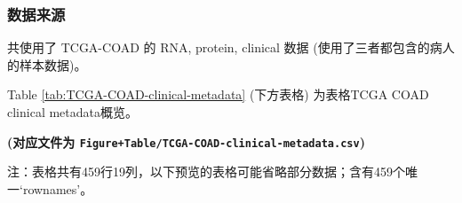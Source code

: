 \documentclass[
]{article}
\begin{document}
\hypertarget{ux6570ux636eux6765ux6e90-1}{%
\subsubsection{数据来源}\label{ux6570ux636eux6765ux6e90-1}}

共使用了 TCGA-COAD 的 RNA, protein, clinical 数据 (使用了三者都包含的病人的样本数据)。

Table \ref{tab:TCGA-COAD-clinical-metadata} (下方表格) 为表格TCGA COAD clinical metadata概览。

\textbf{(对应文件为 \texttt{Figure+Table/TCGA-COAD-clinical-metadata.csv})}

\begin{center}\begin{tcolorbox}[colback=gray!10, colframe=gray!50, width=0.9\linewidth, arc=1mm, boxrule=0.5pt]注：表格共有459行19列，以下预览的表格可能省略部分数据；含有459个唯一`rownames'。
\end{tcolorbox}
\end{center}
\end{document}
